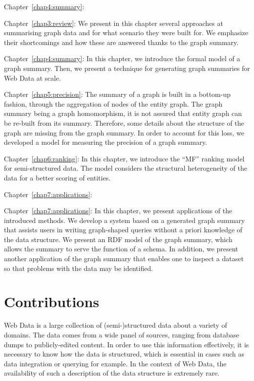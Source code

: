 
\begin{labeling}{Chapter~\ref{chap4:summary}:}
\item[Chapter~\ref{chap3:review}:] We present in this chapter several approaches at summarising graph data and for what scenario they were built for. We emphasize their shortcomings and how these are answered thanks to the graph summary.
\item[Chapter~\ref{chap4:summary}:] In this chapter, we introduce the formal model of a graph summary. Then, we present a technique for generating graph summaries for Web Data at scale.
\item[Chapter~\ref{chap5:precision}:] The summary of a graph is built in a bottom-up fashion, through the aggregation of nodes of the entity graph. The graph summary being a graph homomorphism, it is not assured that entity graph can be re-built from its summary. Therefore, some details about the structure of the graph are missing from the graph summary. In order to account for this loss, we developed a model for measuring the precision of a graph summary.
\item[Chapter~\ref{chap6:ranking}:] In this chapter, we introduce the ``MF'' ranking model for semi-structured data. The model considers the structural heterogeneity of the data for a better scoring of entities.
\end{labeling}


\begin{labeling}{Chapter~\ref{chap7:applications}:}
\item[Chapter~\ref{chap7:applications}:] In this chapter, we present applications of the introduced methods. We develop a system based on a generated graph summary that assists users in writing graph-shaped queries without a priori knowledge of the data structure. We present an RDF model of the graph summary, which allows the summary to serve the function of a schema. In addition, we present another application of the graph summary that enables one to inspect a dataset so that problems with the data may be identified.
\end{labeling}

\section{Contributions}

Web Data is a large collection of (semi-)structured data about a variety of domains. The data comes from a wide panel of sources, ranging from database dumps to publicly-edited content. In order to use this information effectively, it is necessary to know how the data is structured, which is essential in cases such as data integration or querying for example. In the context of Web Data, the availability of such a description of the data structure is extremely rare.

